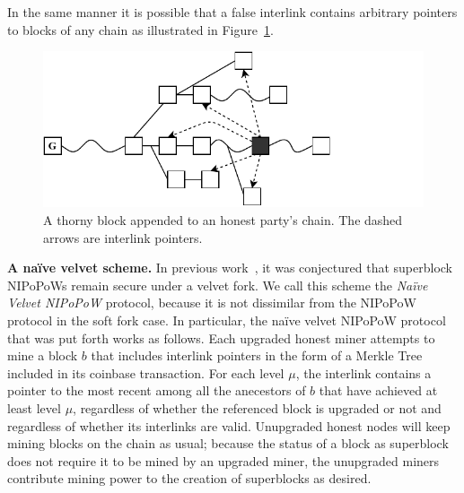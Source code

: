In the same manner it is possible that a false interlink contains arbitrary pointers to blocks of any chain as illustrated in Figure~\ref{fig:thorny_block}.
\begin{figure}[h]
	\begin{center}
		\includegraphics[width=0.9\columnwidth]{figures/thorny_block.pdf}
	\end{center}
	\caption{A thorny block appended to an honest party's chain.
	The dashed arrows are interlink pointers.}
	\label{fig:thorny_block}
\end{figure}

\noindent
\textbf{A na\"ive velvet scheme.}
In previous work~\cite{nipopows}, it was conjectured that superblock NIPoPoWs
remain secure under a velvet fork. We call this scheme the \emph{Na\"ive Velvet
NIPoPoW} protocol, because it is not dissimilar from the NIPoPoW protocol in the
soft fork case. In particular, the na\"ive velvet NIPoPoW protocol that was put
forth works as follows. Each upgraded honest miner attempts to mine a block $b$
that includes interlink pointers in the form of a Merkle Tree included in its
coinbase transaction. For each level $\mu$, the interlink contains a pointer to
the most recent among all the anecestors of $b$ that have achieved at least
level $\mu$, regardless of whether the referenced block is upgraded or not and
regardless of whether its interlinks are valid. Unupgraded honest nodes will
keep mining blocks on the chain as usual; because the status of a block as
superblock does not require it to be mined by an upgraded miner, the unupgraded
miners contribute mining power to the creation of superblocks as desired.

